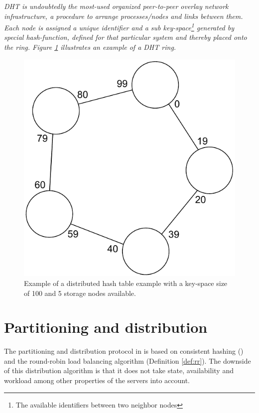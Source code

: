 \begin{definition} \label{def:dht}
\textit{DHT is undoubtedly the most-used organized peer-to-peer overlay network infrastructure, a procedure to arrange processes/nodes and links between them. Each node is assigned a unique identifier and a sub key-space\footnote{The available identifiers between two neighbor nodes}  generated by special hash-function, defined for that particular system and thereby placed onto the ring. Figure \ref{fig:dht} illustrates an example of a DHT ring.}

\begin{figure}[h!]
	\centering
	\includegraphics[scale=0.6]{pdf/dht.pdf}
	\vspace*{3mm}
	\caption[]{Example of a distributed hash table example with a key-space size of 100 and 5 storage nodes available. \label{fig:dht}}
\end{figure}
\end{definition}

\section{Partitioning and distribution} \label{sec:pandd}
The partitioning and distribution protocol in \CodeName is based on consistent hashing () and the round-robin load balancing algorithm (Definition \ref{def:rr}). The downside of this distribution algorithm is that it does not take state, availability and workload among other properties of the servers into account. 
\newline

